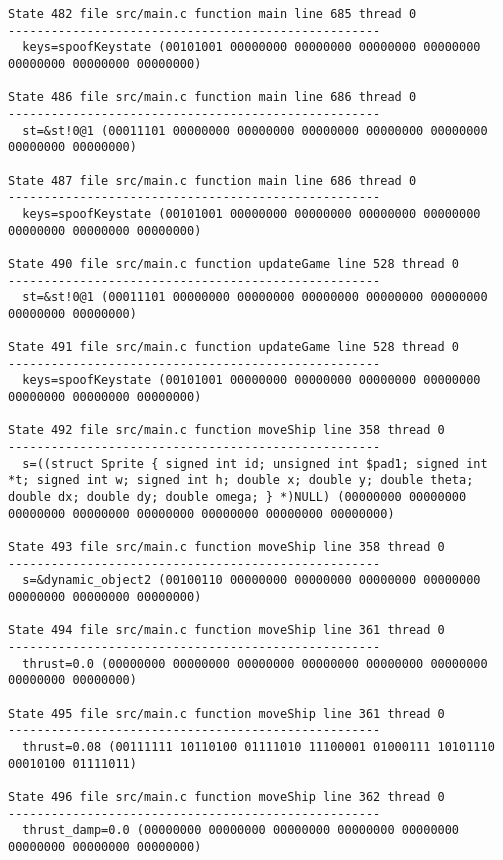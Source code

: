 \begin{verbatim}
State 482 file src/main.c function main line 685 thread 0
----------------------------------------------------
  keys=spoofKeystate (00101001 00000000 00000000 00000000 00000000 00000000 00000000 00000000)

State 486 file src/main.c function main line 686 thread 0
----------------------------------------------------
  st=&st!0@1 (00011101 00000000 00000000 00000000 00000000 00000000 00000000 00000000)

State 487 file src/main.c function main line 686 thread 0
----------------------------------------------------
  keys=spoofKeystate (00101001 00000000 00000000 00000000 00000000 00000000 00000000 00000000)

State 490 file src/main.c function updateGame line 528 thread 0
----------------------------------------------------
  st=&st!0@1 (00011101 00000000 00000000 00000000 00000000 00000000 00000000 00000000)

State 491 file src/main.c function updateGame line 528 thread 0
----------------------------------------------------
  keys=spoofKeystate (00101001 00000000 00000000 00000000 00000000 00000000 00000000 00000000)

State 492 file src/main.c function moveShip line 358 thread 0
----------------------------------------------------
  s=((struct Sprite { signed int id; unsigned int $pad1; signed int *t; signed int w; signed int h; double x; double y; double theta; double dx; double dy; double omega; } *)NULL) (00000000 00000000 00000000 00000000 00000000 00000000 00000000 00000000)

State 493 file src/main.c function moveShip line 358 thread 0
----------------------------------------------------
  s=&dynamic_object2 (00100110 00000000 00000000 00000000 00000000 00000000 00000000 00000000)

State 494 file src/main.c function moveShip line 361 thread 0
----------------------------------------------------
  thrust=0.0 (00000000 00000000 00000000 00000000 00000000 00000000 00000000 00000000)

State 495 file src/main.c function moveShip line 361 thread 0
----------------------------------------------------
  thrust=0.08 (00111111 10110100 01111010 11100001 01000111 10101110 00010100 01111011)

State 496 file src/main.c function moveShip line 362 thread 0
----------------------------------------------------
  thrust_damp=0.0 (00000000 00000000 00000000 00000000 00000000 00000000 00000000 00000000)


\end{verbatim}
